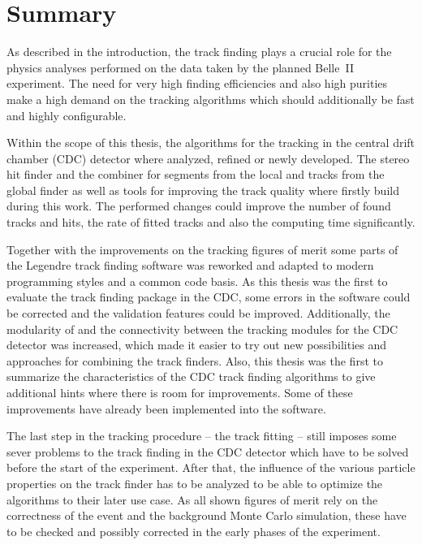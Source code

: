 \chapter*{Summary}

As described in the introduction, the track finding plays a crucial role for the physics analyses performed on the data taken by the planned Belle~II experiment. The need for very high finding efficiencies and also high purities make a high demand on the tracking algorithms which should additionally be fast and highly configurable.

Within the scope of this thesis, the algorithms for the tracking in the central drift chamber (CDC) detector where analyzed, refined or newly developed. The stereo hit finder and the combiner for segments from the local and tracks from the global finder as well as tools for improving the track quality where firstly build during this work. The performed changes could improve the number of found tracks and hits, the rate of fitted tracks and also the computing time significantly.

Together with the improvements on the tracking figures of merit some parts of the Legendre track finding software was reworked and adapted to modern programming styles and a common code basis. As this thesis was the first to evaluate the track finding package in the CDC, some errors in the software could be corrected and the validation features could be improved. Additionally, the modularity of and the connectivity between the tracking modules for the CDC detector was increased, which made it easier to try out new possibilities and approaches for combining the track finders. Also, this thesis was the first to summarize the characteristics of the CDC track finding algorithms to give additional hints where there is room for improvements. Some of these improvements have already been implemented into the software.

The last step in the tracking procedure -- the track fitting -- still imposes some sever problems to the track finding in the CDC detector which have to be solved before the start of the experiment. After that, the influence of the various particle properties on the track finder has to be analyzed to be able to optimize the algorithms to their later use case. As all shown figures of merit rely on the correctness of the event and the background Monte Carlo simulation, these have to be checked and possibly corrected in the early phases of the experiment.

